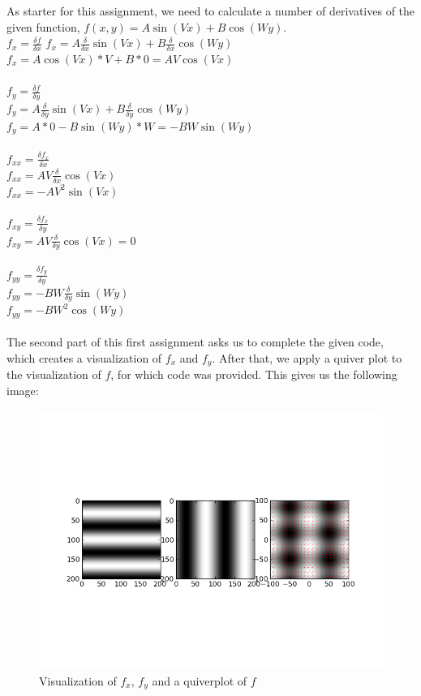 \documentclass[10pt,a4paper]{article}
\begin{document}
As starter for this assignment, we need to calculate a number of
derivatives of the given function, $f(x,y) = A\sin(Vx) + B\cos(Wy)$.\\
$f_{x} = \frac{\delta f}{\delta x}$
$f_x = A\frac{\delta}{\delta x} \sin(Vx) + B\frac{\delta}{\delta x} \cos(Wy)$\\
$f_x = A\cos(Vx) * V + B * 0 = AV\cos(Vx)$\\
\\
$f_{y} = \frac{\delta f}{\delta y}$\\
$f_y = A \frac{\delta}{\delta y}\sin(Vx) + B \frac{\delta}{\delta y}\cos(Wy)$ \\
$f_y = A * 0 - B\sin(Wy) * W = -BW\sin(Wy)$ \\
\\
$f_{xx} = \frac{\delta f_x}{\delta x}$\\
$f_{xx} = AV \frac{\delta}{\delta x}\cos(Vx)$ \\
$f_{xx} = -AV^2\sin(Vx)$\\
\\
$f_{xy} = \frac{\delta f_x}{\delta y}$ \\
$f_{xy} = AV \frac{\delta}{\delta y}\cos(Vx) = 0$ \\
\\
$f_{yy} = \frac{\delta f_y}{\delta y}$ \\
$f_{yy} = -BW \frac{\delta}{\delta y}\sin(Wy)$ \\
$f_{yy} = -BW^2\cos(Wy)$ \\
\\
The second part of this first assignment asks us to complete the
given code, which creates a visualization of $f_x$ and $f_y$.
After that, we apply a quiver plot to the visualization of $f$, for
which code was provided. This gives us the following image:
\begin{figure}[H]
	\includegraphics[scale=0.6]{quiver.png}
	\caption{Visualization of $f_x$, $f_y$ and a quiverplot of $f$}
\end{figure}
\end{document}
